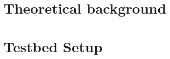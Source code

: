 \documentclass[12pt]{article}
\begin{document}
\section{Theoretical background} \label{theory}
	

\section{Testbed Setup} \label{setup}
	

	
\end{document}
